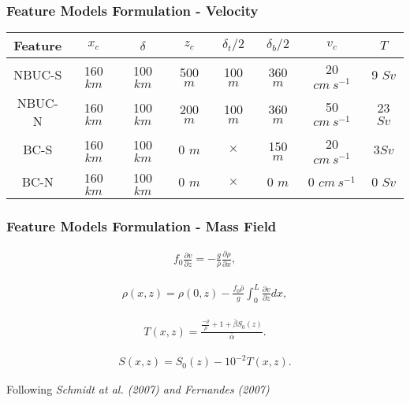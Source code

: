 \documentclass{beamer}
\begin{document}
\frame
{
  \frametitle{Feature Models Formulation - Velocity}

    \begin{footnotesize}
    \begin{center}
    \renewcommand{\arraystretch}{1.5}
    \renewcommand{\tabcolsep}{2mm}
    \begin{tabular}{cccccccc}
        \hline
        \hline
        Feature & $x_c$ & $\delta$ & $z_c$ & $\delta_t/2$ & $\delta_b/2$ & $v_c$ & $T$\\
        \hline
        NBUC-S & 160 $km$ & 100 $km$ & 500 $m$ & 100 $m$ & 360 $m$ & 20 $cm\ s^{-1}$ & 9 $Sv$ \\
        NBUC-N & 160 $km$ & 100 $km$ & 200 $m$ & 100 $m$ & 360 $m$ & 50 $cm\ s^{-1}$ & 23 $Sv$ \\
        \hline
        BC-S & 160 $km$ & 100 $km$ & 0 $m$ & $\times$ & 150 $m$ & 20 $cm\ s^{-1}$ &  3$Sv$ \\
        BC-N & 160 $km$ & 100 $km$ & 0 $m$ & $\times$ & 0 $m$   & 0 $cm\ s^{-1}$ & 0 $Sv$ \\
        \hline
    \end{tabular}
    \end{center}
    \end{footnotesize}
}


\frame
{
  \frametitle{Feature Models Formulation - Mass Field}

\begin{small}
\begin{eqnarray*}
    f_0 \frac{\partial v}{\partial z} = - \frac{g}{\bar{\rho}} \frac{\partial \rho}{\partial x}, 
    \label{eq:thermal_wind}
\end{eqnarray*}

\begin{eqnarray*}
    \rho(x,z) = \rho(0,z) - \frac{f_0 \bar{\rho}}{g} \int_0^L \frac{\partial v}{\partial z} dx, 
    \label{eq:rho}
\end{eqnarray*}

\begin{eqnarray*}
    T(x,z) = \frac{\frac{-\rho}{\bar{\rho}} + 1 + \bar{\beta}S_0(z)}{\bar{\alpha}}.
    \label{eq:temp}
\end{eqnarray*}

\begin{eqnarray*}
    S(x,z) = S_0(z) - 10^{-2} T(x,z).
    \label{eq:salt}
\end{eqnarray*}

\end{small}

\begin{small}
Following {\it Schmidt at al. (2007) and Fernandes (2007)}
\end{small}
}
\end{document}
